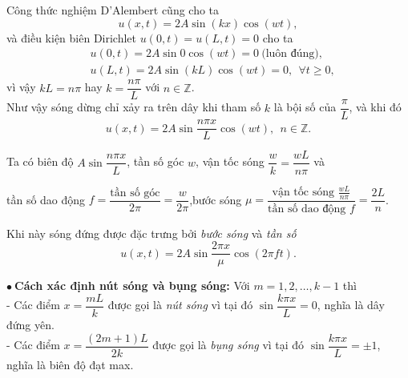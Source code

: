 \documentclass[10pt, a4paper]{article}
\begin{document}
	Công thức nghiệm D'Alembert cũng cho ta $$u(x,t)=2A\sin(kx)\cos(wt),$$
	và điều kiện biên Dirichlet $u(0,t)=u(L,t)=0$ cho ta \begin{align*}
		&u(0,t)=2A\sin0\cos(wt)=0~\text{(luôn đúng)},\\
		&u(L,t)=2A\sin(kL)\cos(wt)=0,~~\forall t\ge0,
	\end{align*}
	vì vậy $kL=n\pi$ hay $k=\dfrac{n\pi}{L}$ với $n\in\mathbb Z$.\\
	
	Như vậy sóng dừng chỉ xảy ra trên dây khi tham số $k$ là bội số của $\dfrac\pi L$, và khi đó $$u(x,t)=2A\sin\frac{n\pi x}{L}\cos(wt),~~n\in\mathbb Z.$$
	
	Ta có biên độ $A\sin\dfrac{n\pi x}{L}$, tần số góc $w$, vận tốc sóng $\dfrac wk=\dfrac{wL}{n\pi}$ và \begin{center}
		tần số dao động $f=\dfrac{\text{tần số góc}}{2\pi}=\dfrac{w}{2\pi}$,\hspace{0.5cm}bước sóng $\mu=\dfrac{\text{vận tốc sóng }\frac{wL}{n\pi}}{\text{tần số dao động }f}=\dfrac{2L}{n}$.
	\end{center}
	
	Khi này sóng đứng được đặc trưng bởi \textit{bước sóng} và \textit{tần số} $$u(x,t)=2A\sin\frac{2\pi x}{\mu}\cos(2\pi ft).$$
	
	$\bullet~$\textbf{Cách xác định nút sóng và bụng sóng:} Với $m=1,2,\ldots,k-1$ thì\\
	
	- Các điểm $x=\dfrac{mL}{k}$ được gọi là \textit{nút sóng} vì tại đó $\sin\dfrac{k\pi x}{L}=0$, nghĩa là dây đứng yên.\\
	
	- Các điểm $x=\dfrac{(2m+1)L}{2k}$ được gọi là \textit{bụng sóng} vì tại đó $\sin\dfrac{k\pi x}{L}=\pm1$, nghĩa là biên độ đạt max.
\end{document}
